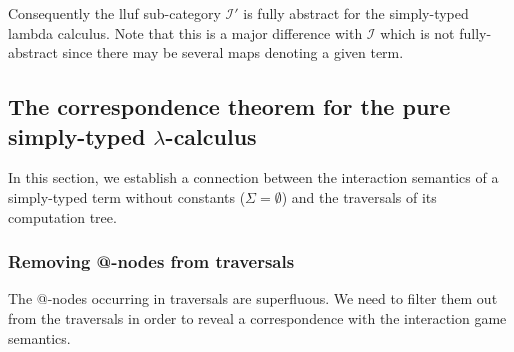 Consequently the lluf sub-category $\mathcal{I'}$ is fully abstract for the simply-typed lambda calculus.
Note that this is a major difference with $\mathcal{I}$ which is not fully-abstract since there may be several maps denoting a given
term.





\subsection{The correspondence theorem for the pure simply-typed $\lambda$-calculus}
In this section, we establish a
connection between the interaction semantics of a simply-typed term without constants ($\Sigma = \emptyset$)
and the traversals of its computation tree.

\subsubsection{Removing @-nodes from traversals}
The @-nodes occurring in traversals are superfluous. We need to filter them out from the traversals
in order to reveal a correspondence with the interaction game semantics.

